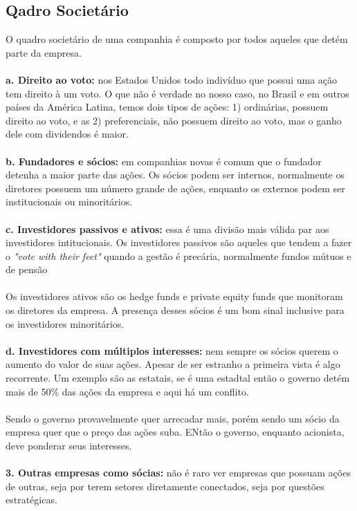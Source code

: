 \subsection*{Qadro Societário}
O quadro societário de uma companhia é composto por todos aqueles que detém parte da empresa.
\\~\\
\textbf{a. Direito ao voto:} nos Estados Unidos todo indivíduo que possui uma ação tem direito à um voto. O que não é verdade no nosso caso, no Brasil e em outros países da América Latina, temos dois tipos de ações: 1) ordinárias, possuem direito ao voto, e as 2) preferenciais, não possuem direito ao voto, mas o ganho dele com dividendos é maior.
\\~\\
\textbf{b. Fundadores e sócios:} em companhias novas é comum que o fundador detenha a maior parte das ações. Os sócios podem ser internos, normalmente os diretores possuem um número grande de ações, enquanto os externos podem ser institucionais ou minoritários.
\\~\\
\textbf{c. Investidores passivos e ativos:} essa é uma divisão mais válida par aos investidores intitucionais. Os investidores passivos são aqueles que tendem a fazer o \textit{"vote with their feet"} quando a gestão é precária, normalmente fundos mútuos e de pensão
\\~\\
 Os investidores ativos são os hedge funds e private equity funds que monitoram os diretores da empresa. A presença desses sócios é um bom sinal inclusive para os investidores minoritários.
\\~\\
\textbf{d. Investidores com múltiplos interesses:} nem sempre os sócios querem o aumento do valor de suas ações. Apesar de ser estranho a primeira vista é algo recorrente. Um exemplo são as estatais, se é uma estadtal então o governo detém mais de 50\% das ações da empresa e aqui há um conflito.
\\~\\
Sendo o governo provavelmente quer arrecadar mais, porém sendo um sócio da empresa quer que o preço das ações suba. ENtão o governo, enquanto acionista, deve ponderar seus interesses.
\\~\\
\textbf{3. Outras empresas como sócias:} não é raro ver empresas que possuam ações de outras, seja por terem setores diretamente conectados, seja por questões estratégicas.
